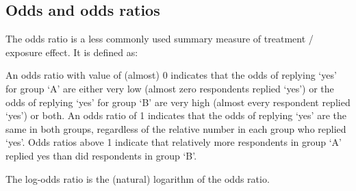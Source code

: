 \subsection{Odds and odds ratios}




The odds ratio is a less commonly used summary measure of treatment /
exposure effect.   It is defined as:


An odds ratio with value of (almost) 0 indicates that the
odds of replying `yes' for group `A' are either very low (almost zero
respondents replied `yes') or the odds of replying `yes' for group `B' are
very high (almost every respondent replied `yes') or both.   An odds ratio of 1
indicates that the odds of replying `yes' are the same in both groups,
regardless of the relative number in each group who replied `yes'.   Odds ratios
above 1 indicate that relatively more respondents in group `A' replied yes
than did respondents in group `B'.

The log-odds ratio is the (natural) logarithm of the odds ratio.


